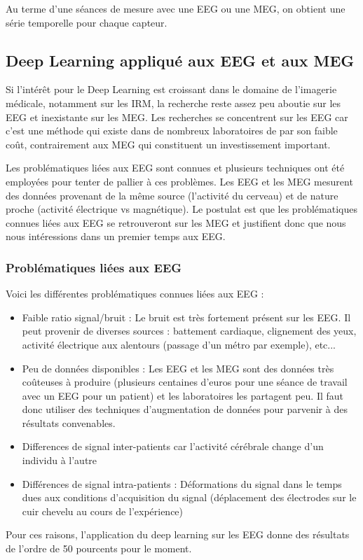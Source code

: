 \documentclass[10pt,twocolumn,letterpaper]{article}
\begin{document}
Au terme d'une séances de mesure avec une EEG ou une MEG, on obtient une série temporelle pour chaque capteur.

\subsection{Deep Learning appliqué aux EEG et aux MEG}

Si l'intérêt pour le Deep Learning est croissant dans le domaine de l'imagerie médicale, notamment sur les IRM, la recherche reste assez peu aboutie sur les EEG et inexistante sur les MEG. Les recherches se concentrent sur les EEG car c'est une méthode qui existe dans de nombreux laboratoires de par son faible coût, contrairement aux MEG qui constituent un investissement important.

Les problématiques liées aux EEG sont connues et plusieurs techniques ont été employées pour tenter de pallier à ces problèmes. Les EEG et les MEG mesurent des données provenant de la même source (l'activité du cerveau) et de nature proche (activité électrique vs magnétique). Le postulat est que les problématiques connues liées aux EEG se retrouveront sur les MEG et justifient donc que nous nous intéressions dans un premier temps aux EEG.

\subsubsection{Problématiques liées aux EEG}
Voici les différentes problématiques connues liées aux EEG :

\begin{itemize}
	\item Faible ratio signal/bruit : Le bruit est très fortement présent sur les EEG. Il peut provenir de diverses sources : battement cardiaque, clignement des yeux, activité électrique aux alentours (passage d'un métro par exemple), etc...
	\item Peu de données disponibles : Les EEG et les MEG sont des données très coûteuses à produire (plusieurs centaines d'euros pour une séance de travail avec un EEG pour un patient) et les laboratoires les partagent peu. Il faut donc utiliser des techniques d'augmentation de données pour parvenir à des résultats convenables.
	\item Differences de signal inter-patients car l'activité cérébrale change d'un individu à l'autre
	\item Différences de signal intra-patients : Déformations du signal dans le temps dues aux conditions d'acquisition du signal (déplacement des électrodes sur le cuir chevelu au cours de l'expérience)
\end{itemize}
Pour ces raisons, l'application du deep learning sur les EEG donne des résultats de l'ordre de 50 pourcents pour le moment.
\end{document}
